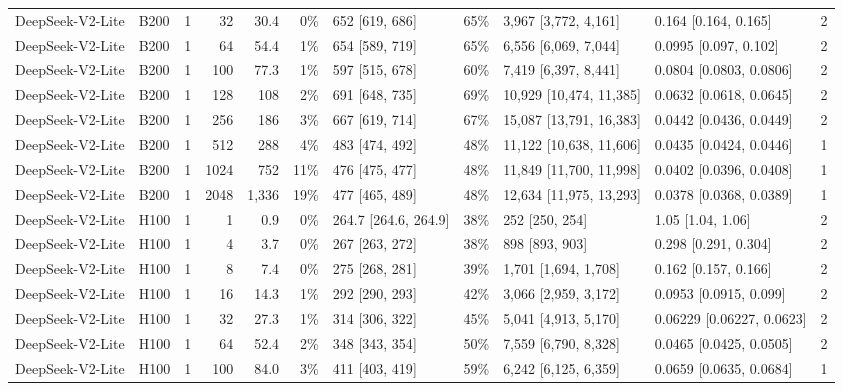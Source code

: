 \begin{landscape}
\begin{longtable}{llrrrrlrllr}
DeepSeek-V2-Lite & B200 & 1 & 32 & 30.4 & 0\% & 652 {[}619, 686{]} & 65\% & 3,967 {[}3,772, 4,161{]} & 0.164 {[}0.164, 0.165{]} & 2 \\
DeepSeek-V2-Lite & B200 & 1 & 64 & 54.4 & 1\% & 654 {[}589, 719{]} & 65\% & 6,556 {[}6,069, 7,044{]} & 0.0995 {[}0.097, 0.102{]} & 2 \\
DeepSeek-V2-Lite & B200 & 1 & 100 & 77.3 & 1\% & 597 {[}515, 678{]} & 60\% & 7,419 {[}6,397, 8,441{]} & 0.0804 {[}0.0803, 0.0806{]} & 2 \\
DeepSeek-V2-Lite & B200 & 1 & 128 & 108 & 2\% & 691 {[}648, 735{]} & 69\% & 10,929 {[}10,474, 11,385{]} & 0.0632 {[}0.0618, 0.0645{]} & 2 \\
DeepSeek-V2-Lite & B200 & 1 & 256 & 186 & 3\% & 667 {[}619, 714{]} & 67\% & 15,087 {[}13,791, 16,383{]} & 0.0442 {[}0.0436, 0.0449{]} & 2 \\
DeepSeek-V2-Lite & B200 & 1 & 512 & 288 & 4\% & 483 {[}474, 492{]} & 48\% & 11,122 {[}10,638, 11,606{]} & 0.0435 {[}0.0424, 0.0446{]} & 1 \\
DeepSeek-V2-Lite & B200 & 1 & 1024 & 752 & 11\% & 476 {[}475, 477{]} & 48\% & 11,849 {[}11,700, 11,998{]} & 0.0402 {[}0.0396, 0.0408{]} & 1 \\
DeepSeek-V2-Lite & B200 & 1 & 2048 & 1,336 & 19\% & 477 {[}465, 489{]} & 48\% & 12,634 {[}11,975, 13,293{]} & 0.0378 {[}0.0368, 0.0389{]} & 1 \\
DeepSeek-V2-Lite & H100 & 1 & 1 & 0.9 & 0\% & 264.7 {[}264.6, 264.9{]} & 38\% & 252 {[}250, 254{]} & 1.05 {[}1.04, 1.06{]} & 2 \\
DeepSeek-V2-Lite & H100 & 1 & 4 & 3.7 & 0\% & 267 {[}263, 272{]} & 38\% & 898 {[}893, 903{]} & 0.298 {[}0.291, 0.304{]} & 2 \\
DeepSeek-V2-Lite & H100 & 1 & 8 & 7.4 & 0\% & 275 {[}268, 281{]} & 39\% & 1,701 {[}1,694, 1,708{]} & 0.162 {[}0.157, 0.166{]} & 2 \\
DeepSeek-V2-Lite & H100 & 1 & 16 & 14.3 & 1\% & 292 {[}290, 293{]} & 42\% & 3,066 {[}2,959, 3,172{]} & 0.0953 {[}0.0915, 0.099{]} & 2 \\
DeepSeek-V2-Lite & H100 & 1 & 32 & 27.3 & 1\% & 314 {[}306, 322{]} & 45\% & 5,041 {[}4,913, 5,170{]} & 0.06229 {[}0.06227, 0.0623{]} & 2 \\
DeepSeek-V2-Lite & H100 & 1 & 64 & 52.4 & 2\% & 348 {[}343, 354{]} & 50\% & 7,559 {[}6,790, 8,328{]} & 0.0465 {[}0.0425, 0.0505{]} & 2 \\
DeepSeek-V2-Lite & H100 & 1 & 100 & 84.0 & 3\% & 411 {[}403, 419{]} & 59\% & 6,242 {[}6,125, 6,359{]} & 0.0659 {[}0.0635, 0.0684{]} & 1 \\

\end{longtable}
\end{landscape}
